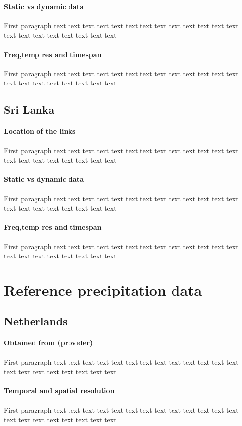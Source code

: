\documentclass[twocolumn, 10pt, a4paper]{memoir}
\begin{document}
		\paragraph{Static vs dynamic data}
		First paragraph 
		text text text text text text text text text text text text text text text text text text text text text
		\paragraph{Freq,temp res and timespan}
		First paragraph 
		text text text text text text text text text text text text text text text text text text text text text
	\subsection{Sri Lanka}
		\paragraph{Location of the links}
		First paragraph 
		text text text text text text text text text text text text text text text text text text text text text
		\paragraph{Static vs dynamic data}
		First paragraph 
		text text text text text text text text text text text text text text text text text text text text text
		\paragraph{Freq,temp res and timespan}
		First paragraph 
		text text text text text text text text text text text text text text text text text text text text text

\section{Reference precipitation data}
	\subsection{Netherlands}
		\paragraph{Obtained from (provider)}
		First paragraph 
		text text text text text text text text text text text text text text text text text text text text text
		\paragraph{Temporal and spatial resolution}
		First paragraph 
		text text text text text text text text text text text text text text text text text text text text text
\end{document}
